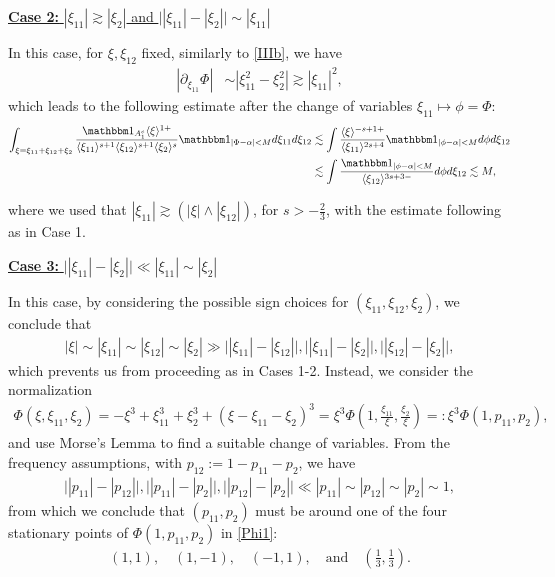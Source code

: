 \documentclass[a4paper,
11pt,  reqno]{amsart}
\newcommand{\5}{\textup{V}}
\newcommand{\noi}{\noindent}
\newcommand{\ind}{\mathbbm 1}
\newcommand{\les}{\lesssim}
\theoremstyle{remark}
\newcommand{\al}{\alpha}
\newcommand{\ges}{\gtrsim}
\newcommand{\jb}[1]
{\langle #1 \rangle}
\numberwithin{equation}{section}
\numberwithin{theorem}{section}
\begin{document}
\smallskip
\noi
\underline{\textbf{Case 2:} $|\xi_{11}| \ges |\xi_2|$ and $\big| |\xi_{11}| - |\xi_2| \big| \sim |\xi_{11}|$}



In this case, for $\xi, \xi_{12}$ fixed, similarly to \eqref{IIIb}, we have 
\begin{align}
| 
\partial_{\xi_{11}} \Phi|
&
\sim |\xi_{11}^2 - \xi_2^2| \ges |\xi_{11}|^2,
\end{align}
which leads to the following estimate after the change of variables $\xi_{11} \mapsto \phi = \Phi$:
\begin{align}
\int_{\xi=\xi_{11} + \xi_{12} + \xi_2} \frac{\ind_{A_1^c} 
\jb{\xi}^{ 1+}}{ \jb{\xi_{11}}^{s+1} \jb{\xi_{12}}^{s+1} \jb{\xi_2}^s}
\ind_{|\Phi - \al| < M}
d\xi_{11}  d\xi_{12}
&
\les \int \frac{\jb{\xi}^{ - s + 1 +} }{ \jb{\xi_{11}}^{2s+4}  } \ind_{|\phi - \al | < M } d\phi d\xi_{12}
\\
&
\les \int \frac{\ind_{|\phi - \al|< M }}{ \jb{\xi_{12}}^{3s + 3 -} } d\phi d\xi_{12} 
\les M, 
\end{align}



\noi
where we used that $|\xi_{11}| \ges (|\xi| \land |\xi_{12}|)$, for $s>-\frac23$, with the estimate following as in Case 1. 



\smallskip

\noi
\underline{\textbf{Case 3:}  $\big| |\xi_{11}| - |\xi_2| \big| \ll |\xi_{11}| \sim |\xi_2|$}

In this case, by considering the possible sign choices for $(\xi_{11}, \xi_{12}, \xi_2)$, we conclude that
\begin{align}
|\xi| \sim |\xi_{11}| \sim |\xi_{12}| \sim |\xi_2| \gg \big| |\xi_{11}| -| \xi_{12}| \big|, \big| |\xi_{11}| -| \xi_{2}| \big|, \big| |\xi_{12}| -| \xi_{2}| \big| ,
\end{align}
which prevents us from proceeding as in Cases 1-2. Instead, we consider the normalization
\begin{align}\label{Phi1}
\Phi(\xi, \xi_{11}, \xi_2) = - \xi^3 + \xi_{11}^3 +  \xi_2^3 + (\xi - \xi_{11} - \xi_2)^3  = \xi^3 \Phi(1, \tfrac{\xi_{11}}{\xi}, \tfrac{\xi_2}{\xi}) =: \xi^3 \Phi(1, p_{11}, p_2), 
\end{align}
and use Morse's Lemma to find a suitable change of variables.
From the frequency assumptions, with $p_{12}:= 1 - p_{11} - p_2$, we have 
\begin{align}
\big| |p_{11}| - |p_{12}| \big|, 
\big| |p_{11}| - |p_2| \big|,
\big| |p_{12}| - |p_2| \big|
 \ll |p_{11}| \sim |p_{12} | \sim |p_2|  \sim 1, 
\end{align}
from which we conclude that 
$(p_{11}, p_2)$ must be around one of the four stationary points of $\Phi(1, p_{11}, p_2)$ in \eqref{Phi1}:
\begin{align}
(1, 1), 
\quad
(1, -1), 
\quad 
(-1,1), 
\quad 
\text{and}
\quad 
(\tfrac13, \tfrac13). 
\end{align}
\end{document}
